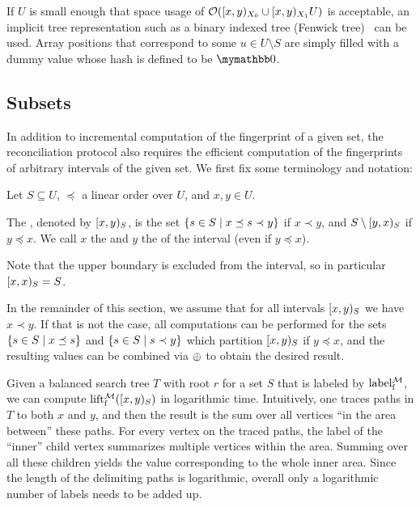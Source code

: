 If $U$ is small enough that space usage of $\mathcal{O}([{x},{y})_{X_0} \cup [{x},{y})_{X_1}{U})$ is acceptable, an implicit tree representation such as a binary indexed tree (Fenwick tree)~\cite{fenwick1994new} can be used. Array positions that correspond to some $u \in U \setminus S$ are simply filled with a dummy value whose hash is defined to be $\neutraladd$.

\subsection{Subsets}
\label{subsets-associative}

In addition to incremental computation of the fingerprint of a given set, the reconciliation protocol also requires the efficient computation of the fingerprints of arbitrary intervals of the given set. We first fix some terminology and notation:

\begin{definition}
\label{def-interval}
Let $S \subseteq U$, $\preceq$ a linear order over $U$, and $x, y \in U$.

The , denoted by $[{x},{y})_{S}$, is the set $\{s \in S \mid x \preceq s \prec y\}$ if $x \prec y$, and $S \setminus [{y},{x})_{S}$ if $y \preceq x$. We call $x$ the  and $y$ the  of the interval (even if $y \preceq x$).

Note that the upper boundary is excluded from the interval, so in particular $[{x},{x})_{S} = S$.
\end{definition}

In the remainder of this section, we assume that for all intervals $[{x},{y})_{S}$ we have $x \prec y$. If that is not the case, all computations can be performed for the sets $\{s \in S \mid x \preceq s\}$ and $\{s \in S \mid s \prec y\}$ which partition $[{x},{y})_{S}$ if $y \preceq x$, and the resulting values can be combined via $\oplus$ to obtain the desired result.

Given a balanced search tree $T$ with root $r$ for a set $S$ that is labeled by $\operatorname{label_{\operatorname{f}}^{\mathcal{M}}}$, we can compute $\operatorname{lift_{\operatorname{f}}^{\mathcal{M}}}([{x},{y})_{S})$ in logarithmic time. Intuitively, one traces paths in $T$ to both $x$ and $y$, and then the result is the sum over all vertices ``in the area between'' these paths. For every vertex on the traced paths, the label of the ``inner'' child vertex summarizes multiple vertices within the area. Summing over all these children yields the value corresponding to the whole inner area. Since the length of the delimiting paths is logarithmic, overall only a logarithmic number of labels needs to be added up.

